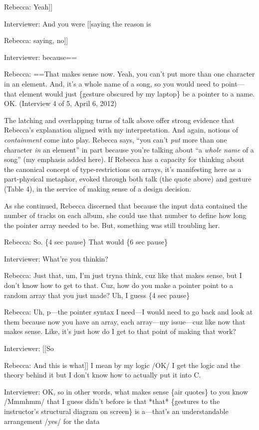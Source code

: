 Rebecca: Yeah{]}{]}

Interviewer: And you were {[}{[}saying the reason is

Rebecca: saying, no{]}{]}

Interviewer: because==

Rebecca: ==That makes sense now. Yeah, you can't put more than one
character in an element. And, it's a whole name of a song, so you would
need to point---that element would just \{gesture obscured by my
laptop\} be a pointer to a name. OK. (Interview 4 of 5, April 6, 2012)

The latching and overlapping turns of talk above offer strong evidence
that Rebecca's explanation aligned with my interpretation. And again,
notions of \emph{containment} come into play. Rebecca says, ``you can't
\emph{put} more than one character \emph{in} an element'' in part
because you're talking about ``a \emph{whole name} of a song'' (my
emphasis added here). If Rebecca has a capacity for thinking about the
canonical concept of type-restrictions on arrays, it's manifesting here
as a part-physical metaphor, evoked through both talk (the quote above)
and gesture (Table 4), in the service of making sense of a design
decision.

As she continued, Rebecca discerned that because the input data
contained the number of tracks on each album, she could use that number
to define how long the pointer array needed to be. But, something was
still troubling her.

Rebecca: So. \{4 sec pause\} That would \{6 sec pause\}

Interviewer: What're you thinkin?

Rebecca: Just that, um, I'm just tryna think, cuz like that makes sense,
but I don't know how to get to that. Cuz, how do you make a pointer
point to a random array that you just made? Uh, I guess \{4 sec pause\}

Rebecca: Uh, p---the pointer syntax I need---I would need to go back and
look at them because now you have an array, each array---my issue---cuz
like now that makes sense. Like, it's just how do I get to that point of
making that work?

Interviewer: {[}{[}So

Rebecca: And this is what{]}{]} I mean by my logic /OK/ I get the logic
and the theory behind it but I don't know how to actually put it into C.

Interviewer: OK, so in other words, what makes
\textbar{}\textbar{}sense\textbar{}\textbar{} \textbar{}\{air
quotes\}\textbar{} to you know /Mmmhmm/ that I guess didn't before is
that *that* \{gestures to the instructor's structural diagram on
screen\} is a---that's an understandable arrangement /yes/ for the data

